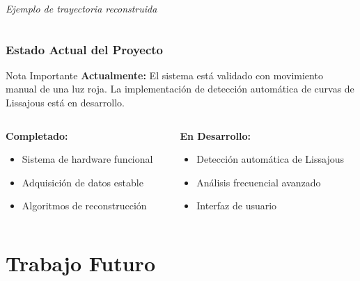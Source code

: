 \documentclass[xcolor=dvipsnames]{beamer}
\begin{document}
\begin{frame}
\begin{columns}
\begin{column}{0.5\textwidth}
\begin{center}
                \vspace{0.3cm}
                \textit{Ejemplo de trayectoria reconstruida}
            \end{center}
        \end{column}
    \end{columns}
\end{frame}


\begin{frame}
    \frametitle{Estado Actual del Proyecto}
    \begin{alertblock}{Nota Importante}
        \textbf{Actualmente:} El sistema está validado con movimiento manual de una luz roja. La implementación de detección automática de curvas de Lissajous está en desarrollo.
    \end{alertblock}
    
    \vspace{0.5cm}
    \begin{columns}
        \begin{column}{0.5\textwidth}
            \textbf{Completado:}
            \begin{itemize}
                \item Sistema de hardware funcional
                \item Adquisición de datos estable
                \item Algoritmos de reconstrucción
            \end{itemize}
        \end{column}
        \begin{column}{0.5\textwidth}
            \textbf{En Desarrollo:}
            \begin{itemize}
                \item Detección automática de Lissajous
                \item Análisis frecuencial avanzado
                \item Interfaz de usuario
            \end{itemize}
        \end{column}
    \end{columns}
\end{frame}

\section{Trabajo Futuro}
\end{document}
